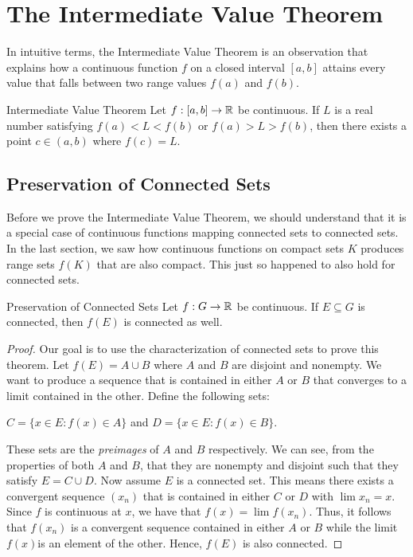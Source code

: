 \section{The Intermediate Value Theorem}

In intuitive terms, the Intermediate Value Theorem is an observation that explains how a continuous function \( f \) on a closed interval \( [a,b] \) attains every value that falls between two range values \( f(a) \) and \( f(b) \).


\begin{theorem}{Intermediate Value Theorem}{}
    Let \( f: [a,b] \to \mathbb{R}  \) be continuous. If \( L  \) is a real number satisfying \( f(a) < L < f(b) \) or \( f(a) > L > f(b) \), then there exists a point \( c \in (a,b) \) where \( f(c) = L  \).
    \end{theorem}

\subsection{Preservation of Connected Sets}

Before we prove the Intermediate Value Theorem, we should understand that it is a special case of continuous functions mapping connected sets to connected sets. In the last section, we saw how continuous functions on compact sets \( K  \) produces range sets \( f(K) \) that are also compact. This just so happened to also hold for connected sets.


\begin{theorem}{Preservation of Connected Sets}{}
    Let \( f: G \to \mathbb{R}  \) be continuous. If \( E \subseteq G  \) is connected, then \( f(E) \) is connected as well.
    \end{theorem}

\begin{proof}
Our goal is to use the characterization of connected sets to prove this theorem. Let \( f(E) = A \cup B  \) where \( A  \) and \( B  \) are disjoint and nonempty. We want to produce a sequence that is contained in either \( A  \) or \( B  \) that converges to a limit contained in the other. Define the following sets:
\begin{center}
    \( C = \{ x \in E: f(x) \in A  \}  \) and \( D = \{ x \in E : f(x) \in B  \}  \).
\end{center}
These sets are the \textit{preimages} of \( A  \) and \( B  \) respectively. We can see, from the properties of both \( A  \) and \( B  \), that they are nonempty and disjoint such that they satisfy \( E = C \cup D  \). Now assume \( E  \) is a connected set. This means there exists a convergent sequence \( (x_n)  \) that is contained in either \( C  \) or \( D  \) with \( \lim x_n = x  \). Since \( f \) is continuous at \( x  \), we have that \( f(x) = \lim f(x_n) \). Thus, it follows that \( f(x_n) \) is a convergent sequence contained in either \( A  \) or \( B  \) while the limit \( f(x)  \)is an element of the other. Hence, \( f(E ) \) is also connected.
\end{proof}

